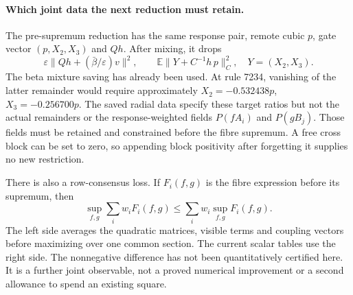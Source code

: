 \paragraph{Which joint data the next reduction must retain.}
The pre-supremum reduction has the same response pair, remote cubic $p$,
gate vector $(p,X_2,X_3)$ and $Qh$. After mixing, it drops
\[
 \varepsilon\|Qh+(\bar\beta/\varepsilon)v\|^2,
 \qquad
 \mathbb E\|Y+C^{-1}h\,p\|_C^2,\quad Y=(X_2,X_3).
\]
The beta mixture saving has already been used. At rule 7234, vanishing
of the latter remainder would require approximately
$X_2=-0.532438p$, $X_3=-0.256700p$.
The saved radial data specify these target ratios but not the actual
remainders or the response-weighted fields $P(fA_i)$ and $P(gB_j)$.
Those fields must be retained and constrained before the fibre
supremum. A free cross block can be set to zero, so appending block
positivity after forgetting it supplies no new restriction.

There is also a row-consensus loss. If $F_i(f,g)$ is the fibre
expression before its supremum, then
\[
 \sup_{f,g}\sum_iw_iF_i(f,g)
 \le\sum_iw_i\sup_{f,g}F_i(f,g).
\]
The left side averages the quadratic matrices, visible terms and
coupling vectors before maximizing over one common section. The
current scalar tables use the right side. The nonnegative difference
has not been quantitatively certified here. It is a further joint
observable, not a proved numerical improvement or a second allowance
to spend an existing square.
